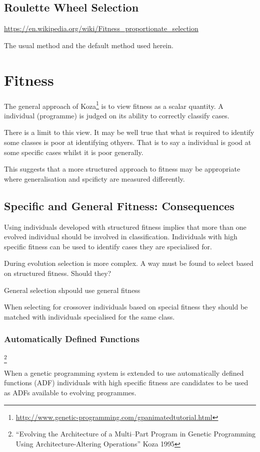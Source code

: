 \documentclass[a4paper,twoside]{article}
\begin{document}
\subsection{Roulette Wheel Selection}

\url{https://en.wikipedia.org/wiki/Fitness_proportionate_selection}

The usual method and the default method used herein.

\section{Fitness}

The general approach of
Koza\footnote{\url{http://www.genetic-programming.com/gpanimatedtutorial.html}}
is to view fitness as a scalar quantity.  A individual (programme) is
judged on its ability to correctly classify cases.

There is a limit to this view.  It may be well true that what is
required to identify some classes is poor at identifying othyers.
That is to say a individual is good at some specific cases whilst it
is poor generally.

This suggests that a more structured approach to fitness may be
appropriate where generalisation and spcificty are measured
differently.

\subsection{Specific and General Fitness: Consequences}

Using individuals developed with structured fitness implies that more
than one evolved individual should be involved in classification.
Individuals with high specific fitness can be used to identify cases
they are specialised for.

During evolution selection is more complex.  A way must be found to
select based on structured fitness.  Should they?

General selection shpould use general fitness

When selecting for crossover individuals based on special fitness they
should be matched with individuals specialised for the same class.

\subsubsection{Automatically Defined Functions}\footnote{``Evolving
  the Architecture of a Multi--Part Program in Genetic Programming
  Using Architecture-Altering Operations'' Koza 1995}

When a genetic programming system is extended to use automatically
defined functions (ADF) individuals with high specific fitness are
candidates to be used as ADFs available to evolving programmes.


  
\end{document}
